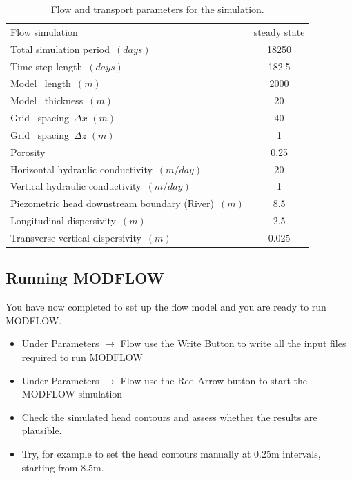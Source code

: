 \begin{table}[t]
\caption{Flow and transport parameters for the simulation.}
\begin{center}
\begin{tabular}{lc} 
\toprule
Flow simulation                     & steady state \\
Total simulation period\ $ (days)      $         &  18250            \\
Time step length\ $ (days)      $         &  182.5            \\
Model \  length\ $ (m)      $         &  2000            \\
Model \  thickness\ $(m)$                        &  20            \\
Grid \ spacing\ $\Delta x $ $(m)$                &    40            \\
Grid \ spacing\ $\Delta z $ $(m)$                &    1            \\
Porosity\     $            $         &  0.25           \\
Horizontal hydraulic conductivity\ $(m/day)$               &  20         \\ 
Vertical   hydraulic conductivity\ $(m/day)$               &  1         \\ 
Piezometric head downstream boundary (River)\ $(m)        $         &  8.5           \\ 
Longitudinal dispersivity\ $(m)         $         &  2.5          \\ 
Transverse  vertical dispersivity\ $(m)         $         &  0.025          \\ 
\bottomrule
\end{tabular}
\label{franken_flow}
\end{center}
\end{table}

\subsection{Running MODFLOW}

You have now completed to set up the flow model and you are ready to run MODFLOW.

\begin{itemize}

\item Under {\color{blue}Parameters} $\rightarrow$ {\color{blue}Flow} use the {\color{blue}Write Button} to write all the input files required to run MODFLOW

\item Under {\color{blue}Parameters} $\rightarrow$ {\color{blue}Flow} use the 
{\color{blue}Red Arrow} button to start the MODFLOW simulation

\item Check the simulated head contours and assess whether the results are plausible.

\item Try, for example to set the head contours manually at 0.25m intervals, starting from 8.5m.


\end{itemize}

